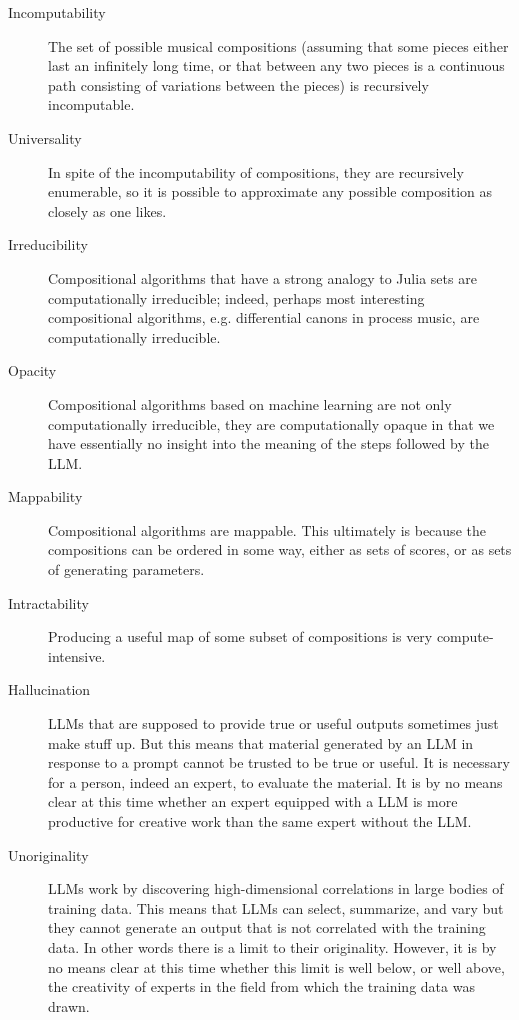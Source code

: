 \documentclass[11pt]{scrartcl}
\begin{document}
\begin{description}
\item[Incomputability] The set of possible musical compositions (assuming that some pieces either last an infinitely long time, or that between any two pieces is a continuous path consisting of variations between the pieces) is recursively incomputable.
\item[Universality] In spite of the incomputability of compositions, they are recursively enumerable, so it is possible to approximate any possible composition as closely as one likes.
\item[Irreducibility] Compositional algorithms that have a strong analogy to Julia sets are computationally irreducible; indeed, perhaps most interesting compositional algorithms, e.g. differential canons in process music, are computationally irreducible.
\item[Opacity] Compositional algorithms based on machine learning are not only computationally irreducible, they are computationally opaque in that we have essentially no insight into the meaning of the steps followed by the LLM.
\item[Mappability] Compositional algorithms are mappable. This ultimately is because the compositions can be ordered in some way, either as sets of scores, or as sets of generating parameters.
\item[Intractability] Producing a useful map of some subset of compositions is very compute-intensive. 
\item[Hallucination] LLMs that are supposed to provide true or useful outputs sometimes just make stuff up. But this means that material generated by an LLM in response to a prompt cannot be trusted to be true or useful. It is necessary for a person, indeed an expert, to evaluate the material. It is by no means clear at this time whether an expert equipped with a LLM is more productive for creative work than the same expert without the LLM.
\item[Unoriginality] LLMs work by discovering high-dimensional correlations in large bodies of training data. This means that LLMs can select, summarize, and vary but they cannot generate an output that is not correlated with the training data. In other words there is a limit to their originality. However, it is by no means clear at this time whether this limit is well below, or well above, the creativity of experts in the field from which the training data was drawn.
\end{description}
\end{document}
